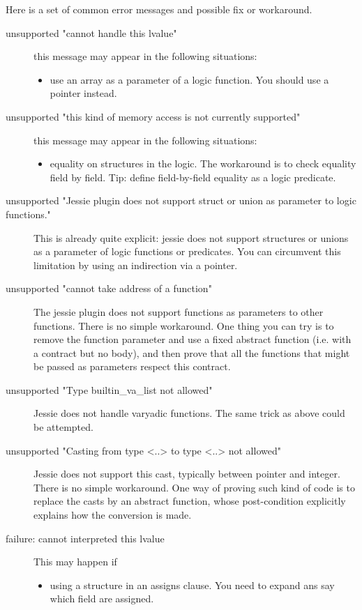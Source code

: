 \documentclass[a4paper,11pt,twoside,openright]{report}
\begin{document}
Here is a set of common error messages and possible fix or workaround.
\begin{description}

\item [unsupported "cannot handle this lvalue"]
  this message may appear in the following situations:
  \begin{itemize}
  \item use an array as a parameter of a logic function. You should use
    a pointer instead.
  \end{itemize}

\item[unsupported "this kind of memory access is not currently supported"]
    this message may appear in the following situations:
  \begin{itemize}
  \item equality on structures in the logic. The workaround is to
    check equality field by field. Tip: define field-by-field equality as a
    logic predicate.
  \end{itemize}

\item[unsupported "Jessie plugin does not support struct or union as
  parameter to logic functions."]  This
  is already quite explicit: jessie does not support structures or
  unions as a parameter of logic functions or predicates. You can
  circumvent this limitation by using an indirection via a pointer.

\item[unsupported "cannot take address of a function"] The jessie
  plugin does not support functions as parameters to other
  functions. There is no simple workaround. One thing you can try is
  to remove the function parameter and use a fixed abstract function
  (i.e. with a contract but no body), and then prove that all the
  functions that might be passed as parameters respect this contract.

\item[unsupported "Type builtin\_va\_list not allowed"] Jessie does not
  handle varyadic functions. The same trick as above could be
  attempted.

\item[unsupported "Casting from type <..> to type <..> not allowed"]
  Jessie does not support this cast, typically between pointer and
  integer. There is no simple workaround. One way of proving such kind
  of code is to replace the casts by an abstract function, whose
  post-condition explicitly explains how the conversion is made.

\item[failure: cannot interpreted this lvalue]
  This may happen if
  \begin{itemize}
  \item using a structure in an assigns clause. You need to expand ans
    say which field are assigned.
  \end{itemize}

\end{description}




\end{document}
